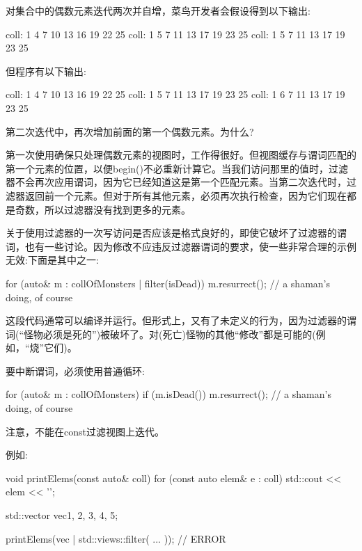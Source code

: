 对集合中的偶数元素迭代两次并自增，菜鸟开发者会假设得到以下输出:

\begin{shell}
coll: 1 4 7 10 13 16 19 22 25
coll: 1 5 7 11 13 17 19 23 25
coll: 1 5 7 11 13 17 19 23 25
\end{shell}

但程序有以下输出:

\begin{shell}
coll: 1 4 7 10 13 16 19 22 25
coll: 1 5 7 11 13 17 19 23 25
coll: 1 6 7 11 13 17 19 23 25
\end{shell}

第二次迭代中，再次增加前面的第一个偶数元素。为什么?

第一次使用确保只处理偶数元素的视图时，工作得很好。但视图缓存与谓词匹配的第一个元素的位置，以便begin()不必重新计算它。当我们访问那里的值时，过滤器不会再次应用谓词，因为它已经知道这是第一个匹配元素。当第二次迭代时，过滤器返回前一个元素。但对于所有其他元素，必须再次执行检查，因为它们现在都是奇数，所以过滤器没有找到更多的元素。

关于使用过滤器的一次写访问是否应该是格式良好的，即使它破坏了过滤器的谓词，也有一些讨论。因为修改不应违反过滤器谓词的要求，使一些非常合理的示例无效:下面是其中之一:

\begin{cpp}
for (auto& m : collOfMonsters | filter(isDead)) {
	m.resurrect(); // a shaman’s doing, of course
}
\end{cpp}

这段代码通常可以编译并运行。但形式上，又有了未定义的行为，因为过滤器的谓词(“怪物必须是死的”)被破坏了。对(死亡)怪物的其他“修改”都是可能的(例如，“烧”它们)。

要中断谓词，必须使用普通循环:

\begin{cpp}
for (auto& m : collOfMonsters) {
	if (m.isDead()) {
		m.resurrect(); // a shaman’s doing, of course
	}
}
\end{cpp}


注意，不能在const过滤视图上迭代。

例如:

\begin{cpp}
void printElems(const auto& coll) {
	for (const auto elem& e : coll) {
		std::cout << elem << '\n';
	}
}

std::vector vec{1, 2, 3, 4, 5};

printElems(vec | std::views::filter( ... )); // ERROR
\end{cpp}

